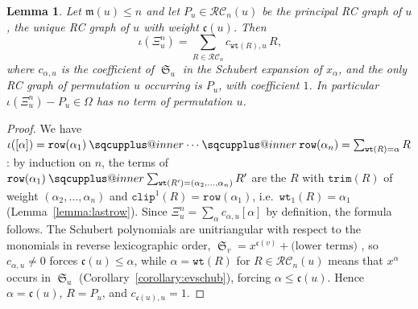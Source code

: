 \documentclass{amsart}
\makeatletter
\newcommand{\sqcupplus@inner}[2]{%
  \vcenter{\hbox{\ooalign{%
    \hfil$\m@th#1\sqcup$\hfil\cr
    \hfil\raisebox{0.15ex}{$\m@th#1\scriptscriptstyle+$}\hfil\cr
  }}}%
}
\newcommand{\sqcupplus}{\mathbin{\mathpalette\sqcupplus@inner\relax}}
\newtheorem{lemma}{Lemma}[subsection]
\theoremstyle{definition}
\theoremstyle{remark}
\numberwithin{equation}{subsection}
\DeclareMathOperator{\sch}{\mathfrak{S}}
\newcommand{\wtt}{\mathtt{wt}}
\newcommand{\trm}{\mathtt{trim}}
\newcommand{\clp}{\mathtt{clip}}
\newcommand{\RC}{\mathcal{RC}}
\newcommand{\dsch}{\ensuremath{\Xi}}
\newcommand{\code}{\mathfrak{c}}
\newcommand{\maxd}{\mathfrak{m}}
\makeatother
\begin{document}
\begin{lemma}\label{lemma:principalsection}
Let $\maxd(u)\leq n$ and let $P_u\in\RC_n(u)$ be the principal RC graph of $u$, the unique RC graph of $u$ with weight $\code(u)$. Then
$$\iota(\dsch_u^n)=\sum_{R\in\RC_n}c_{\wtt(R),u}\,R\text{,}$$
where $c_{\alpha,u}$ is the coefficient of $\sch_u$ in the Schubert expansion of $x_\alpha$, and the only RC graph of permutation $u$ occurring is $P_u$, with coefficient $1$. In particular $\iota(\dsch_u^n)-P_u\in\Omega$ has no term of permutation $u$.
\end{lemma}
\begin{proof}
We have $\iota([\alpha])=\mathtt{row}(\alpha_1)\sqcupplus\cdots\sqcupplus\mathtt{row}(\alpha_n)=\sum_{\wtt(R)=\alpha}R$: by induction on $n$, the terms of $\mathtt{row}(\alpha_1)\sqcupplus\sum_{\wtt(R')=(\alpha_2,\ldots,\alpha_n)}R'$ are the $R$ with $\trm(R)$ of weight $(\alpha_2,\ldots,\alpha_n)$ and $\clp^1(R)=\mathtt{row}(\alpha_1)$, i.e.\ $\wtt_1(R)=\alpha_1$ (Lemma~\ref{lemma:lastrow}). Since $\dsch_u^n=\sum_\alpha c_{\alpha,u}[\alpha]$ by definition, the formula follows. The Schubert polynomials are unitriangular with respect to the monomials in reverse lexicographic order, $\sch_v=x^{\code(v)}+\text{(lower terms)}$ \cite{notes}, so $c_{\alpha,u}\neq0$ forces $\code(u)\leq\alpha$, while $\alpha=\wtt(R)$ for $R\in\RC_n(u)$ means that $x^\alpha$ occurs in $\sch_u$ (Corollary~\ref{corollary:evschub}), forcing $\alpha\leq\code(u)$. Hence $\alpha=\code(u)$, $R=P_u$, and $c_{\code(u),u}=1$.
\end{proof}
\end{document}
